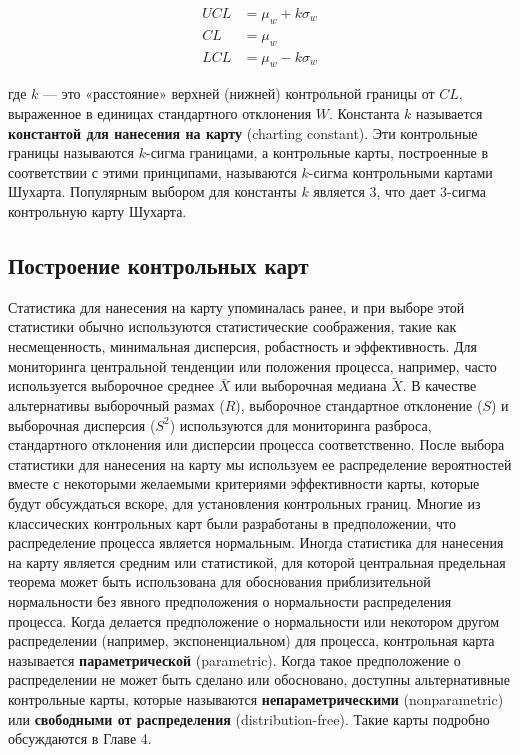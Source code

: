 \begin{equation}
	\begin{aligned}
		UCL &= \mu_w + k\sigma_w \\
		CL &= \mu_w \\
		LCL &= \mu_w - k\sigma_w
	\end{aligned}
	\label{eq:2.1}
\end{equation}

где \(k\) — это «расстояние» верхней (нижней) контрольной границы от \(CL\), выраженное в единицах стандартного отклонения \(W\). Константа \(k\) называется \textbf{константой для нанесения на карту} (charting constant). Эти контрольные границы называются \(k\)-сигма границами, а контрольные карты, построенные в соответствии с этими принципами, называются \(k\)-сигма контрольными картами Шухарта. Популярным выбором для константы \(k\) является 3, что дает 3-сигма контрольную карту Шухарта.

\subsection{Построение контрольных карт}
Статистика для нанесения на карту упоминалась ранее, и при выборе этой статистики обычно используются статистические соображения, такие как несмещенность, минимальная дисперсия, робастность и эффективность. Для мониторинга центральной тенденции или положения процесса, например, часто используется выборочное среднее \(\bar{X}\) или выборочная медиана \(\tilde{X}\). В качестве альтернативы выборочный размах (\(R\)), выборочное стандартное отклонение (\(S\)) и выборочная дисперсия (\(S^2\)) используются для мониторинга разброса, стандартного отклонения или дисперсии процесса соответственно. После выбора статистики для нанесения на карту мы используем ее распределение вероятностей вместе с некоторыми желаемыми критериями эффективности карты, которые будут обсуждаться вскоре, для установления контрольных границ. Многие из классических контрольных карт были разработаны в предположении, что распределение процесса является нормальным. Иногда статистика для нанесения на карту является средним или статистикой, для которой центральная предельная теорема может быть использована для обоснования приблизительной нормальности без явного предположения о нормальности распределения процесса. Когда делается предположение о нормальности или некотором другом распределении (например, экспоненциальном) для процесса, контрольная карта называется \textbf{параметрической} (parametric). Когда такое предположение о распределении не может быть сделано или обосновано, доступны альтернативные контрольные карты, которые называются \textbf{непараметрическими} (nonparametric) или \textbf{свободными от распределения} (distribution-free). Такие карты подробно обсуждаются в Главе 4.

